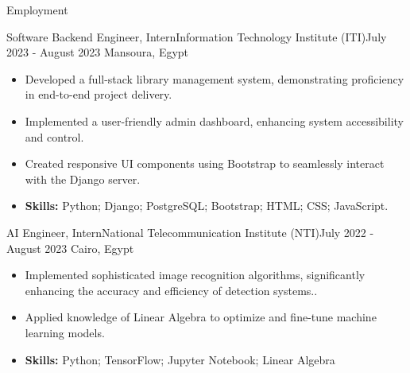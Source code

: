 \documentclass[]{cv}
\begin{document}
	\makeheader 



		

	\begin{cvsection}{Employment}
				\vspace{3mm}


				\begin{cvsubsection}{Software Backend Engineer, Intern}{Information Technology Institute (ITI)}{July 2023 - August 2023 \linebreak Mansoura, Egypt}
			\vspace{2mm}

			\begin{itemize}
				\item Developed a full-stack library management system, demonstrating proficiency in end-to-end project delivery.
				\item Implemented a user-friendly admin dashboard, enhancing system accessibility and control.
				\item Created responsive UI components using Bootstrap to seamlessly interact with the Django server.
				\item \textbf{Skills:} Python; Django; PostgreSQL; Bootstrap; HTML; CSS; JavaScript.
			\end{itemize}
		\end{cvsubsection}		
		\begin{cvsubsection}{AI Engineer, Intern}{National Telecommunication Institute (NTI)}{July 2022 - August 2023 \linebreak Cairo, Egypt}
			\vspace{3mm}

			\begin{itemize}
				\item Implemented sophisticated image recognition algorithms, significantly enhancing the accuracy and efficiency of detection systems..
				\item Applied knowledge of Linear Algebra to optimize and fine-tune machine learning models.
				\item \textbf{Skills:} Python; TensorFlow; Jupyter Notebook; Linear Algebra 
			\end{itemize}
		\end{cvsubsection}
		

		
	
		
	\end{cvsection}
	
\end{document}

